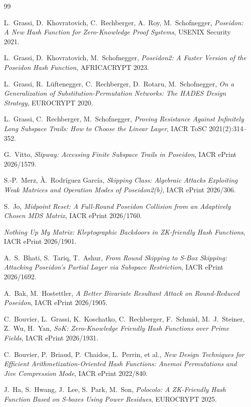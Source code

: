 \documentclass[11pt]{article}
\begin{document}
\begin{thebibliography}{99}

L.~Grassi, D.~Khovratovich, C.~Rechberger, A.~Roy, M.~Schofnegger,
\emph{Poseidon: A New Hash Function for Zero-Knowledge Proof Systems},
USENIX Security 2021.

L.~Grassi, D.~Khovratovich, M.~Schofnegger,
\emph{Poseidon2: A Faster Version of the Poseidon Hash Function},
AFRICACRYPT 2023.

L.~Grassi, R.~L\"uftenegger, C.~Rechberger, D.~Rotaru, M.~Schofnegger,
\emph{On a Generalization of Substitution-Permutation Networks: The HADES
Design Strategy}, EUROCRYPT 2020.

L.~Grassi, C.~Rechberger, M.~Schofnegger,
\emph{Proving Resistance Against Infinitely Long Subspace Trails: How to
Choose the Linear Layer}, IACR ToSC 2021(2):314--352.

G.~Vitto, \emph{Slipway: Accessing Finite Subspace Trails in Poseidon},
IACR ePrint 2026/1579.

S.-P.~Merz, \`A.~Rodr\'iguez Garc\'ia,
\emph{Skipping Class: Algebraic Attacks Exploiting Weak Matrices and
Operation Modes of Poseidon2(b)}, IACR ePrint 2026/306.

S.~Jo, \emph{Midpoint Reset: A Full-Round Poseidon Collision from an
Adaptively Chosen MDS Matrix}, IACR ePrint 2026/1760.

\emph{Nothing Up My Matrix: Kleptographic Backdoors in ZK-friendly Hash
Functions}, IACR ePrint 2026/1901.

A.~S.~Bhati, S.~Tariq, T.~Ashur,
\emph{From Round Skipping to S-Box Skipping: Attacking Poseidon's Partial
Layer via Subspace Restriction}, IACR ePrint 2026/1692.

A.~Bak, M.~Hostettler,
\emph{A Better Bivariate Resultant Attack on Round-Reduced Poseidon},
IACR ePrint 2026/1905.

C.~Bouvier, L.~Grassi, K.~Koschatko, C.~Rechberger, F.~Schmid,
M.~J.~Steiner, Z.~Wu, H.~Yan,
\emph{SoK: Zero-Knowledge Friendly Hash Functions over Prime Fields},
IACR ePrint 2026/1931.

C.~Bouvier, P.~Briaud, P.~Chaidos, L.~Perrin, et al.,
\emph{New Design Techniques for Efficient Arithmetization-Oriented Hash
Functions: Anemoi Permutations and Jive Compression Mode},
IACR ePrint 2022/840.

J.~Ha, S.~Hwang, J.~Lee, S.~Park, M.~Son,
\emph{Polocolo: A ZK-Friendly Hash Function Based on S-boxes Using Power
Residues}, EUROCRYPT 2025.

\end{thebibliography}
\end{document}
